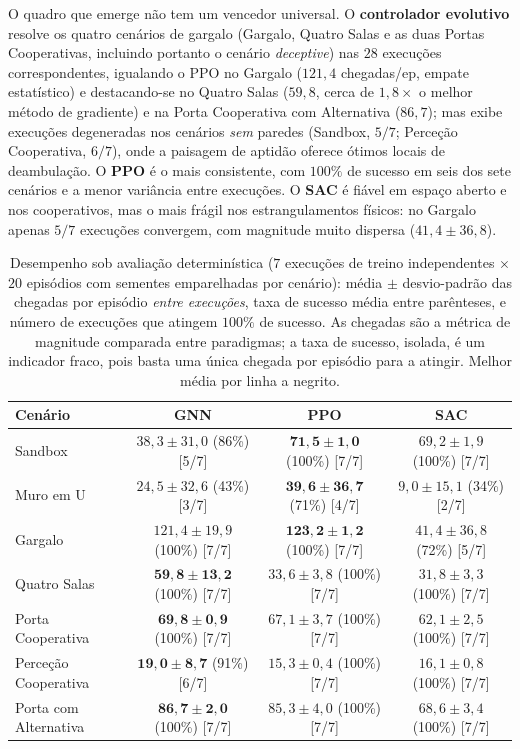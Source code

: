 \documentclass[final,5p,times,twocolumn,authoryear]{elsarticle}
\begin{document}
 O quadro que emerge não tem um vencedor universal. O \textbf{controlador
evolutivo} resolve os quatro cenários de gargalo (Gargalo, Quatro Salas e as
duas Portas Cooperativas, incluindo portanto o cenário \emph{deceptive}) nas
$28$ execuções correspondentes, igualando o PPO no Gargalo ($121{,}4$ chegadas/ep,
empate estatístico) e destacando-se no Quatro Salas
($59{,}8$, cerca de $1{,}8\times$ o melhor método de gradiente) e na Porta Cooperativa
com Alternativa ($86{,}7$); mas exibe execuções degeneradas nos
cenários \emph{sem} paredes (Sandbox, $5/7$; Perceção Cooperativa, $6/7$), onde a
paisagem de aptidão oferece ótimos locais de deambulação. O \textbf{PPO} é o mais
consistente, com $100\%$ de sucesso em seis dos sete cenários e a menor variância
entre execuções. O \textbf{SAC} é fiável em espaço aberto e nos cooperativos, mas
o mais frágil nos estrangulamentos físicos: no Gargalo apenas $5/7$ execuções
convergem, com magnitude muito dispersa ($41{,}4\pm36{,}8$).

\begin{table}[t]
\centering
\caption{Desempenho sob avaliação determinística ($7$ execuções de treino
independentes $\times$ $20$ episódios com sementes emparelhadas por cenário):
média $\pm$ desvio-padrão das chegadas por episódio \emph{entre execuções},
taxa de sucesso média entre parênteses, e número de execuções que atingem $100\%$
de sucesso. As chegadas são a métrica de magnitude comparada entre
paradigmas; a taxa de sucesso, isolada, é um indicador fraco, pois basta uma
única chegada por episódio para a atingir. Melhor média por linha a negrito.}
\label{tab:task}
\footnotesize
\begin{tabular}{lccc}
\toprule
Cenário & GNN & PPO & SAC \\
\midrule
Sandbox                     & $38{,}3\pm31{,}0$ (86\%) [5/7] & $\mathbf{71{,}5\pm1{,}0}$ (100\%) [7/7] & $69{,}2\pm1{,}9$ (100\%) [7/7] \\
Muro em U                   & $24{,}5\pm32{,}6$ (43\%) [3/7] & $\mathbf{39{,}6\pm36{,}7}$ (71\%) [4/7] & $9{,}0\pm15{,}1$ (34\%) [2/7] \\
Gargalo                     & $121{,}4\pm19{,}9$ (100\%) [7/7] & $\mathbf{123{,}2\pm1{,}2}$ (100\%) [7/7] & $41{,}4\pm36{,}8$ (72\%) [5/7] \\
Quatro Salas                & $\mathbf{59{,}8\pm13{,}2}$ (100\%) [7/7] & $33{,}6\pm3{,}8$ (100\%) [7/7] & $31{,}8\pm3{,}3$ (100\%) [7/7] \\
Porta Cooperativa           & $\mathbf{69{,}8\pm0{,}9}$ (100\%) [7/7] & $67{,}1\pm3{,}7$ (100\%) [7/7] & $62{,}1\pm2{,}5$ (100\%) [7/7] \\
Perceção Cooperativa        & $\mathbf{19{,}0\pm8{,}7}$ (91\%) [6/7] & $15{,}3\pm0{,}4$ (100\%) [7/7] & $16{,}1\pm0{,}8$ (100\%) [7/7] \\
Porta com Alternativa       & $\mathbf{86{,}7\pm2{,}0}$ (100\%) [7/7] & $85{,}3\pm4{,}0$ (100\%) [7/7] & $68{,}6\pm3{,}4$ (100\%) [7/7] \\
\bottomrule
\end{tabular}
\end{table}
\end{document}
